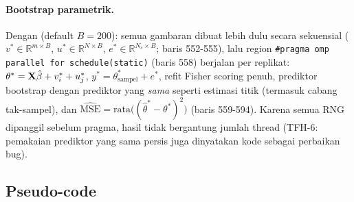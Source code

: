 \paragraph{Bootstrap parametrik.} Dengan  (default
$B=200$): semua gambaran dibuat lebih dulu secara sekuensial
($v^\ast\in\mathbb R^{m\times B}$, $u^\ast\in\mathbb R^{N\times B}$,
$e^\ast\in\mathbb R^{N_s\times B}$; baris 552-555), lalu region
\texttt{\#pragma omp parallel for schedule(static)} (baris 558) berjalan per
replikat: $\theta^\ast=\mathbf{X}\hat\beta+v^\ast_i+u^\ast_j$,
$y^\ast=\theta^\ast_{\text{sampel}}+e^\ast$, refit Fisher scoring penuh,
prediktor bootstrap dengan prediktor yang \emph{sama} seperti estimasi titik
(termasuk cabang tak-sampel), dan $\widehat{\mathrm{MSE}}=\mathrm{rata}
\bigl((\hat\theta^\ast-\theta^\ast)^2\bigr)$ (baris 559-594). Karena semua
RNG dipanggil sebelum pragma, hasil tidak bergantung jumlah thread
(TFH-6: pemakaian prediktor yang sama persis juga dinyatakan kode sebagai
perbaikan bug).

\subsection{Pseudo-code}\label{sec:twofold-algo}

